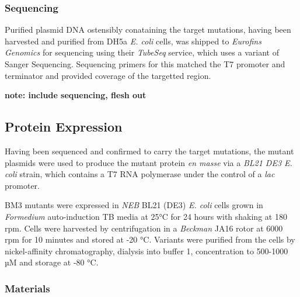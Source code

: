 \documentclass{article}
\begin{document}
\subsubsection{Sequencing}

Purified plasmid DNA ostensibly conataining the target mutations, having been harvested and purified from DH5a \textit{E. coli} cells, was shipped to \textit{Eurofins Genomics} for sequencing using their \textit{TubeSeq} service, which uses a variant of Sanger Sequencing.
Sequencing primers for this matched the T7 promoter and terminator and provided coverage of the targetted region.

\textbf{note: include sequencing, flesh out}


\subsection{Protein Expression}

Having been sequenced and confirmed to carry the target mutations, the mutant plasmids were used to produce the mutant protein \textit{en masse} via a \textit{BL21 DE3 E. coli} strain, which contains a T7 RNA polymerase under the control of a \textit{lac} promoter.
\par
BM3 mutants were expressed in \textit{NEB} BL21 (DE3) \textit{E. coli} cells grown in \textit{Formedium} auto-induction TB media at 25°C for 24 hours with shaking at 180 rpm. Cells were harvested by centrifugation in a \textit{Beckman} JA16 rotor at 6000 rpm for 10 minutes and stored at -20 °C. Variants were purified from the cells by nickel-affinity chromatography, dialysis into buffer 1, concentration to 500-1000 µM and storage at -80 °C. %

\subsubsection{Materials}
\end{document}
